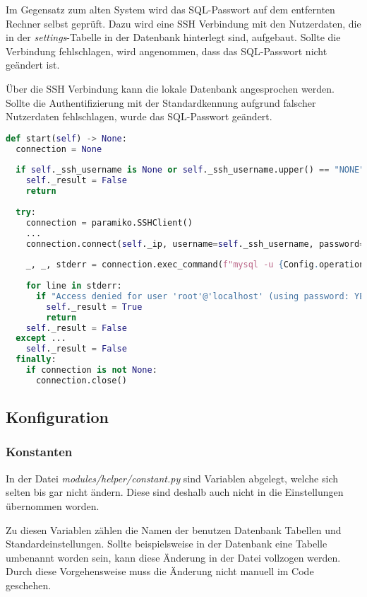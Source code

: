 Im Gegensatz zum alten System wird das SQL-Passwort auf dem entfernten Rechner selbst geprüft.
Dazu wird eine SSH Verbindung mit den Nutzerdaten, die in der \textit{settings}-Tabelle in der Datenbank hinterlegt sind, aufgebaut. Sollte die Verbindung fehlschlagen, wird angenommen, dass das SQL-Passwort nicht geändert ist.

Über die SSH Verbindung kann die lokale Datenbank angesprochen werden. Sollte die Authentifizierung mit der Standardkennung aufgrund falscher Nutzerdaten fehlschlagen, wurde das SQL-Passwort geändert.

\begin{lstlisting}[language=Python, frame=single, caption={Big Brother SQL-Passwort}, captionpos=b, label={lst:bigbrother-sql-password}]
def start(self) -> None:
  connection = None
  
  if self._ssh_username is None or self._ssh_username.upper() == "NONE" or self._ssh_password is None or self._ssh_password.upper() == "NONE":
    self._result = False
    return
  
  try:
    connection = paramiko.SSHClient()
    ...
    connection.connect(self._ip, username=self._ssh_username, password=self._ssh_password, timeout=Config.operations['base']['ssh_timeout'])
    
    _, _, stderr = connection.exec_command(f"mysql -u {Config.operations['sql']['username']} -p{Config.operations['sql']['password']} -e 'quit'")
    
    for line in stderr:
      if "Access denied for user 'root'@'localhost' (using password: YES)" in line.strip('\n'):
        self._result = True
        return
    self._result = False
  except ...
    self._result = False
  finally:
    if connection is not None:
      connection.close()
\end{lstlisting}

\subsection{Konfiguration}

\subsubsection{Konstanten}

In der Datei \textit{modules/helper/constant.py} sind Variablen abgelegt, welche sich selten bis gar nicht ändern. Diese sind deshalb auch nicht in die Einstellungen übernommen worden.

Zu diesen Variablen zählen die Namen der benutzen Datenbank Tabellen und Standardeinstellungen.
Sollte beispielsweise in der Datenbank eine Tabelle umbenannt worden sein, kann diese Änderung in der Datei vollzogen werden. Durch diese Vorgehensweise muss die Änderung nicht manuell im Code geschehen.

